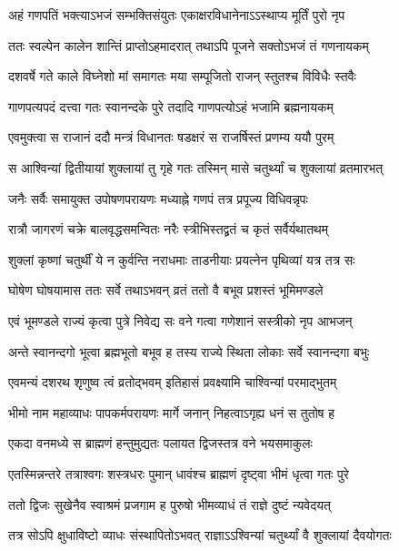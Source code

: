 \twolineshloka
{अहं गणपतिं भक्त्याऽभजं सम्भक्तिसंयुतः}
{एकाक्षरविधानेनाऽऽस्थाप्य मूर्तिं पुरो नृप} %

\twolineshloka
{ततः स्वल्पेन कालेन शान्तिं प्राप्तोऽहमादरात्}
{तथाऽपि पूजने सक्तोऽभजं तं गणनायकम्} %

\twolineshloka
{दशवर्षे गते काले विघ्नेशो मां समागतः}
{मया सम्पूजितो राजन् स्तुतश्च विविधैः स्तवैः} %

\twolineshloka
{गाणपत्यपदं दत्त्वा गतः स्वानन्दके पुरे}
{तदादि गाणपत्योऽहं भजामि ब्रह्मनायकम्} %

\twolineshloka
{एवमुक्त्वा स राजानं ददौ मन्त्रं विधानतः}
{षडक्षरं स राजर्षिस्तं प्रणम्य ययौ पुरम्} %

\twolineshloka
{स आश्विन्यां द्वितीयायां शुक्लायां तु गृहे गतः}
{तस्मिन् मासे चतुर्थ्यां च शुक्लायां व्रतमारभत्} %

\twolineshloka
{जनैः सर्वैः समायुक्त उपोषणपरायणः}
{मध्याह्ने गणपं तत्र प्रपूज्य विधिवन्नृपः} %

\twolineshloka
{रात्रौ जागरणं चक्रे बालवृद्धसमन्वितः}
{नरैः स्त्रीभिस्तद्व्रतं च कृतं सर्वैर्यथातथम्} %

\twolineshloka
{शुक्लां कृष्णां चतुर्थीं ये न कुर्वन्ति नराधमाः}
{ताडनीयाः प्रयत्नेन पृथिव्यां यत्र तत्र सः} %

\twolineshloka
{घोषेण घोषयामास ततः सर्वे तथाऽभवन्}
{व्रतं ततो वै बभूव प्रशस्तं भूमिमण्डले} %

\twolineshloka
{एवं भूमण्डले राज्यं कृत्वा पुत्रे निवेद्य सः}
{वने गत्वा गणेशानं सस्त्रीको नृप आभजन्} %

\twolineshloka
{अन्ते स्वानन्दगो भूत्वा ब्रह्मभूतो बभूव ह}
{तस्य राज्ये स्थिता लोकाः सर्वे स्वानन्दगा बभुः} %

\twolineshloka
{एवमन्यं दशरथ श‍ृणुष्व त्वं व्रतोद्भवम्}
{इतिहासं प्रवक्ष्यामि चाश्विन्यां परमाद्भुतम्} %

\twolineshloka
{भीमो नाम महाव्याधः पापकर्मपरायणः}
{मार्गे जनान् निहत्वाऽगृह्य धनं स तुतोष ह} %

\twolineshloka
{एकदा वनमध्ये स ब्राह्मणं हन्तुमुद्यतः}
{पलायत द्विजस्तत्र वने भयसमाकुलः} %

\twolineshloka
{एतस्मिन्नन्तरे तत्राश्वगः शस्त्रधरः पुमान्}
{धावंश्च ब्राह्मणं दृष्ट्वा भीमं धृत्वा गतः पुरे} %

\twolineshloka
{ततो द्विजः सुखेनैव स्वाश्रमं प्रजगाम ह}
{पुरुषो भीमव्याधं तं राज्ञे दुष्टं न्यवेदयत्} %

\twolineshloka
{तत्र सोऽपि क्षुधाविष्टो व्याधः संस्थापितोऽभवत्}
{राज्ञाऽऽश्विन्यां चतुर्थ्यां वै शुक्लायां दैवयोगतः} %

